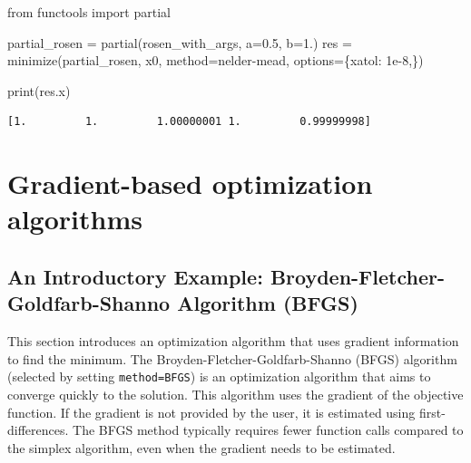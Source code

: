 \documentclass[
  letterpaper,
  DIV=11,
  numbers=noendperiod]{scrreprt}
\newenvironment{Shaded}{\begin{snugshade}}{\end{snugshade}}
\newcommand{\BuiltInTok}[1]{\textcolor[rgb]{0.00,0.23,0.31}{#1}}
\newcommand{\FloatTok}[1]{\textcolor[rgb]{0.68,0.00,0.00}{#1}}
\newcommand{\ImportTok}[1]{\textcolor[rgb]{0.00,0.46,0.62}{#1}}
\newcommand{\NormalTok}[1]{\textcolor[rgb]{0.00,0.23,0.31}{#1}}
\newcommand{\OperatorTok}[1]{\textcolor[rgb]{0.37,0.37,0.37}{#1}}
\newcommand{\StringTok}[1]{\textcolor[rgb]{0.13,0.47,0.30}{#1}}
\begin{document}
\begin{Shaded}
\begin{Highlighting}[]
\ImportTok{from}\NormalTok{ functools }\ImportTok{import}\NormalTok{ partial}

\NormalTok{partial\_rosen }\OperatorTok{=}\NormalTok{ partial(rosen\_with\_args, a}\OperatorTok{=}\FloatTok{0.5}\NormalTok{, b}\OperatorTok{=}\FloatTok{1.}\NormalTok{)}
\NormalTok{res }\OperatorTok{=}\NormalTok{ minimize(partial\_rosen, x0, method}\OperatorTok{=}\StringTok{\textquotesingle{}nelder{-}mead\textquotesingle{}}\NormalTok{,}
\NormalTok{               options}\OperatorTok{=}\NormalTok{\{}\StringTok{\textquotesingle{}xatol\textquotesingle{}}\NormalTok{: }\FloatTok{1e{-}8}\NormalTok{,\})}

\BuiltInTok{print}\NormalTok{(res.x)}
\end{Highlighting}
\end{Shaded}

\begin{verbatim}
[1.         1.         1.00000001 1.         0.99999998]
\end{verbatim}

\section{Gradient-based optimization
algorithms}\label{gradient-based-optimization-algorithms}

\subsection{An Introductory Example: Broyden-Fletcher-Goldfarb-Shanno
Algorithm (BFGS)}\label{sec-bfgs-intro}

This section introduces an optimization algorithm that uses gradient
information to find the minimum. The Broyden-Fletcher-Goldfarb-Shanno
(BFGS) algorithm (selected by setting
\texttt{method=\textquotesingle{}BFGS\textquotesingle{}}) is an
optimization algorithm that aims to converge quickly to the solution.
This algorithm uses the gradient of the objective function. If the
gradient is not provided by the user, it is estimated using
first-differences. The BFGS method typically requires fewer function
calls compared to the simplex algorithm, even when the gradient needs to
be estimated.
\end{document}
